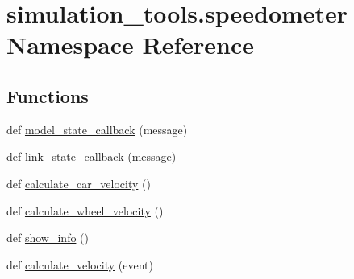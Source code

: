\hypertarget{namespacesimulation__tools_1_1speedometer}{}\section{simulation\+\_\+tools.\+speedometer Namespace Reference}
\label{namespacesimulation__tools_1_1speedometer}
\subsection*{Functions}
\begin{DoxyCompactItemize}
\item 
def \hyperlink{namespacesimulation__tools_1_1speedometer_ad8cbde404030a049eb657fd78f8bec45}{model\+\_\+state\+\_\+callback} (message)
\item 
def \hyperlink{namespacesimulation__tools_1_1speedometer_a9f675598deb566912ae5dfcef851ee8e}{link\+\_\+state\+\_\+callback} (message)
\item 
def \hyperlink{namespacesimulation__tools_1_1speedometer_a3323b9f8885fc1ce38dd75f2555cccba}{calculate\+\_\+car\+\_\+velocity} ()
\item 
def \hyperlink{namespacesimulation__tools_1_1speedometer_af7706082fba920fe977bdb0e4dd464f8}{calculate\+\_\+wheel\+\_\+velocity} ()
\item 
def \hyperlink{namespacesimulation__tools_1_1speedometer_a605162cce10e81643f8f38ad72363b65}{show\+\_\+info} ()
\item 
def \hyperlink{namespacesimulation__tools_1_1speedometer_aad7d50b1f509c29bb6b854ea4b649947}{calculate\+\_\+velocity} (event)
\end{DoxyCompactItemize}
